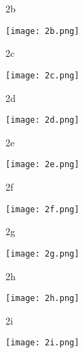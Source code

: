\documentclass[norsk, handout]{beamer}
\begin{document}
	\begin{frame}{2b}
		\begin{center}
			\texttt{[image: 2b.png]}
		\end{center}
	\end{frame}

	\begin{frame}{2c}
		\begin{center}
			\texttt{[image: 2c.png]}
		\end{center}
	\end{frame}

	\begin{frame}{2d}
		\begin{center}
			\texttt{[image: 2d.png]}
		\end{center}
	\end{frame}

	\begin{frame}{2e}
		\begin{center}
			\texttt{[image: 2e.png]}
		\end{center}
	\end{frame}

	\begin{frame}{2f}
		\begin{center}
			\texttt{[image: 2f.png]}
		\end{center}
	\end{frame}

	\begin{frame}{2g}
		\begin{center}
			\texttt{[image: 2g.png]}
		\end{center}
	\end{frame}

	\begin{frame}{2h}
		\begin{center}
			\texttt{[image: 2h.png]}
		\end{center}
	\end{frame}

	\begin{frame}{2i}
		\begin{center}
			\texttt{[image: 2i.png]}
		\end{center}
	\end{frame}
\end{document}
